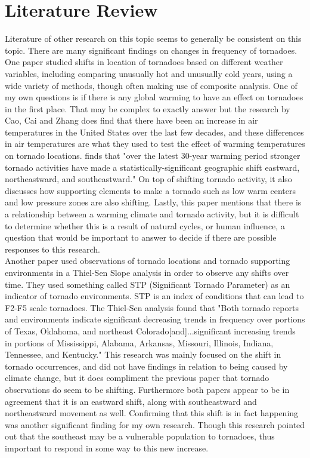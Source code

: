 \documentclass[12pt,english]{article}
\begin{document}
\section{Literature Review}\label{sec:litreview}

\hspace{1cm} Literature of other research on this topic seems to generally be consistent on this topic. There are many significant findings on changes in frequency of tornadoes. One paper studied shifts in location of tornadoes based on different weather variables, including comparing unusually hot and unusually cold years, using a wide variety of methods, though often making use of composite analysis. One of my own questions is if there is any global warming to have an effect on tornadoes in the first place. That may be complex to exactly answer but the research by Cao, Cai and Zhang does find that there have been an increase in air temperatures in the United States over the last few decades, and these differences in air temperatures are what they used to test the effect of warming temperatures on tornado locations. finds that "over the latest 30-year warming period stronger tornado activities have made a statistically-significant geographic shift eastward, northeastward, and southeastward."\cite{Cao2021} On top of shifting tornado activity, it also discusses how supporting elements to make a tornado such as low warm centers and low pressure zones are also shifting. Lastly, this paper mentions that there is a relationship between a warming climate and tornado activity, but it is difficult to determine whether this is a result of natural cycles, or human influence, a question that would be important to answer to decide if there are possible responses to this research. \\
Another paper used observations of tornado locations and tornado supporting environments in a Thiel-Sen Slope analysis in order to observe any shifts over time. They used something called STP (Significant Tornado Parameter) as an indicator of tornado environments. STP is an index of conditions that can lead to F2-F5 scale tornadoes\cite{noaa}. The Thiel-Sen analysis found that "Both tornado reports and environments indicate significant decreasing trends in frequency over portions of Texas, Oklahoma, and northeast Colorado[and]...significant increasing trends in portions of Mississippi, Alabama, Arkansas, Missouri, Illinois, Indiana, Tennessee, and Kentucky."\cite{Vittorio2018}  This research was mainly focused on the shift in tornado occurrences, and did not have findings in relation to being caused by climate change, but it does compliment the previous paper that tornado observations do seem to be shifting. Furthermore both papers appear to be in agreement that it is an eastward shift, along with southeastward and northeastward movement as well. Confirming that this shift is in fact happening was another significant finding for my own research. Though this research pointed out that the southeast may be a vulnerable population to tornadoes, thus important to respond in some way to this new increase. \\
\end{document}
